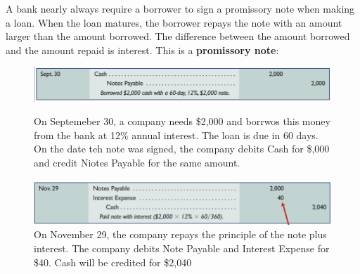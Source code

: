 \documentclass[../main.tex]{subfiles}
\begin{document}
	A bank nearly always require a borrower to sign a promissory note when 
	making a loan. When the loan matures, the borrower repays the note with an 
	amount larger than the amount borrowed. The difference between the amount 
	borrowed and the amount repaid is interest. This is a \textbf{promissory 
		note}:
	\begin{figure}[ht]
		\includegraphics[width=1\columnwidth]{images/c10_promissory_note1.png}
		\caption{On Septemeber 30, a company needs \$2,000 and borrwos this 
		money 
			from the bank at 12\% annual interest. The loan is due in 60 days. 
			On the 
			date teh note was signed, the company debits Cash for \$,000 and 
			credit 
			Niotes Payable for the same amount.}
		\includegraphics[width=1\columnwidth]{images/c10_promissory_note2.png}
		\caption{On November 29, the company repays the principle of the note 
		plus 
			interest. The company debits Note Payable and Interest Expense for 
			\$40. 
			Cash will be credited for \$2,040}
	\end{figure}
	
\end{document}
